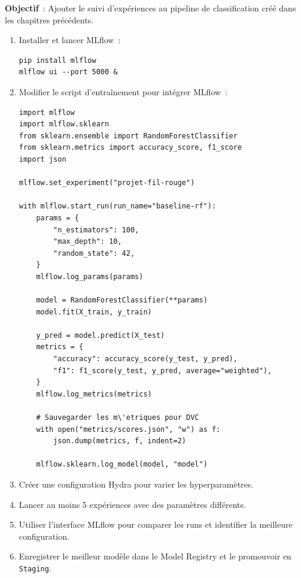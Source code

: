 \begin{miniprojet}[title=\textbf{Instrumenter le projet des chapitres 1--3 avec MLflow}]
\textbf{Objectif}~: Ajouter le suivi d'exp\'eriences au pipeline de
classification cr\'e\'e dans les chapitres pr\'ec\'edents.

\begin{enumerate}
  \item Installer et lancer MLflow~:
\begin{verbatim}
pip install mlflow
mlflow ui --port 5000 &
\end{verbatim}

  \item Modifier le script d'entra\^inement pour int\'egrer MLflow~:
\begin{verbatim}
import mlflow
import mlflow.sklearn
from sklearn.ensemble import RandomForestClassifier
from sklearn.metrics import accuracy_score, f1_score
import json

mlflow.set_experiment("projet-fil-rouge")

with mlflow.start_run(run_name="baseline-rf"):
    params = {
        "n_estimators": 100,
        "max_depth": 10,
        "random_state": 42,
    }
    mlflow.log_params(params)

    model = RandomForestClassifier(**params)
    model.fit(X_train, y_train)

    y_pred = model.predict(X_test)
    metrics = {
        "accuracy": accuracy_score(y_test, y_pred),
        "f1": f1_score(y_test, y_pred, average="weighted"),
    }
    mlflow.log_metrics(metrics)

    # Sauvegarder les m\'etriques pour DVC
    with open("metrics/scores.json", "w") as f:
        json.dump(metrics, f, indent=2)

    mlflow.sklearn.log_model(model, "model")
\end{verbatim}

  \item Cr\'eer une configuration Hydra pour varier les hyperparam\`etres.

  \item Lancer au moins 5 exp\'eriences avec des param\`etres diff\'erents.

  \item Utiliser l'interface MLflow pour comparer les runs et
        identifier la meilleure configuration.

  \item Enregistrer le meilleur mod\`ele dans le Model Registry et le
        promouvoir en \texttt{Staging}.
\end{enumerate}
\end{miniprojet}

